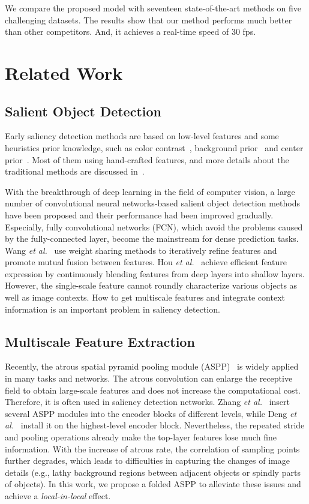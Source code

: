 \documentclass[runningheads]{llncs}
\begin{document}
	We compare the proposed model with seventeen state-of-the-art methods on five challenging datasets. The results show that our method performs much better than other competitors. And, it achieves a real-time speed of 30 fps.
	
	\section{Related Work}
	\subsection{Salient Object Detection}
	Early saliency detection methods are based on low-level features and some heuristics prior knowledge, such as color contrast~\cite{colorcontrast/Fm}, background prior~\cite{boundarybackground} and center prior~\cite{centerprior}. Most of them using hand-crafted features, and more details about the traditional methods are discussed in~\cite{Survey}.
	
	With the breakthrough of deep learning in the field of computer vision, a large number of convolutional neural networks-based salient object detection methods have been proposed and their performance had been improved gradually. 
Especially, fully convolutional networks (FCN), which avoid the problems caused by the fully-connected layer, become the mainstream for dense prediction tasks. Wang \textit{et al.}~\cite{RFCN} use weight sharing methods to iteratively refine features and promote mutual fusion between features. Hou \textit{et al.}~\cite{DSS} achieve efficient feature expression by continuously blending features from deep layers into shallow layers. However, the single-scale feature cannot roundly characterize various objects as well as image contexts. How to get multiscale features and integrate context information is an important problem in saliency detection.
	\subsection{Multiscale Feature Extraction}
	Recently, the atrous spatial pyramid pooling module (ASPP)~\cite{Deeplab} is widely applied in many tasks and networks. The atrous convolution can enlarge the receptive field to obtain large-scale features and does not increase the computational cost. 
	Therefore, it is often used in saliency detection networks. 
Zhang \textit{et al.}~\cite{BMPM} insert several ASPP modules into the encoder blocks of different levels, while Deng \textit{et al.}~\cite{R3Net} install it on the highest-level encoder block. 
Nevertheless, the repeated stride and pooling operations already make the top-layer features lose much fine information. With the increase of atrous rate, the correlation of sampling points further degrades, which leads to difficulties in capturing the changes of image details (e.g., lathy background regions between adjacent objects or spindly parts of objects). In this work, we propose a folded ASPP to alleviate these issues and achieve a \textsl{local-in-local} effect.
\end{document}
